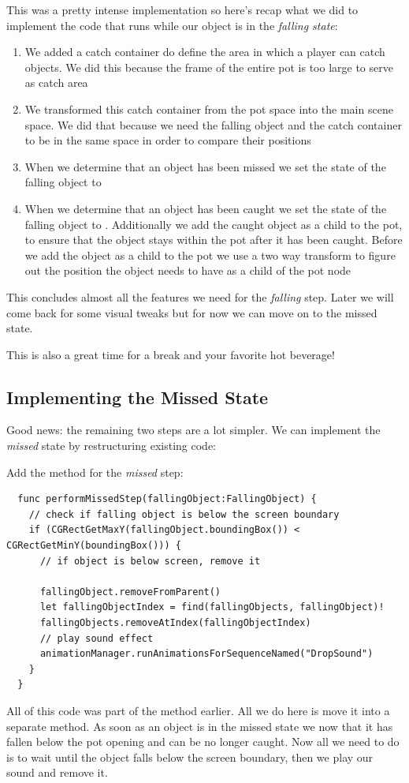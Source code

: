 This was a pretty intense implementation so here's recap what we did to
implement the code that runs while our object is in the \textit{falling state}:
\begin{enumerate}
  \item We added a catch container do define the area in which a player can
  catch objects. We did this because the frame of the entire pot is too large to
  serve as catch area
  \item We transformed this catch container from the pot space into the main
  scene space. We did that because we need the falling object and the catch
  container to be in the same space in order to compare their positions
  \item When we determine that an object has been missed we set the state of the
  falling object to 
  \item When we determine that an object has been caught we set the state of the
  falling object to . Additionally we add the caught object
  as a child to the pot, to ensure that the object stays within the pot after it
  has been caught. Before we add the object as a child to the pot we use a two
  way transform to figure out the position the object needs to have as a child
  of the pot node
\end{enumerate}

This concludes almost all the features we need for the \textit{falling} step.
Later we will come back for some visual tweaks but for now we can move on to the
missed state. 

This is also a great time for a break and your favorite hot
beverage!
\subsection{Implementing the Missed State}
Good news: the remaining two steps are a lot simpler. We can implement the
\textit{missed} state by restructuring existing code:
\begin{leftbar}
Add the method for the \textit{missed} step:
\begin{lstlisting}
  func performMissedStep(fallingObject:FallingObject) {
    // check if falling object is below the screen boundary
    if (CGRectGetMaxY(fallingObject.boundingBox()) < CGRectGetMinY(boundingBox())) {
      // if object is below screen, remove it
      
      fallingObject.removeFromParent()
      let fallingObjectIndex = find(fallingObjects, fallingObject)!
      fallingObjects.removeAtIndex(fallingObjectIndex)
      // play sound effect
      animationManager.runAnimationsForSequenceNamed("DropSound")
    }
  }
\end{lstlisting}
\end{leftbar}
All of this code was part of the  method earlier. All we do
here is move it into a separate method. As soon as an object is in the missed
state we now that it has fallen below the pot opening and can be no longer
caught. Now all we need to do is to wait until the object falls below the
screen boundary, then we play our sound and remove it.

